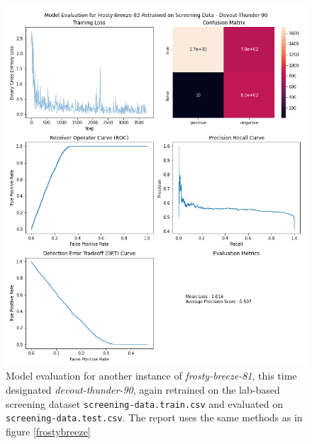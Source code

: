 \documentclass{article}
\begin{document}
\begin{figure}
	\caption{\label{devoutthunder} Model evaluation for another instance of \textit{frosty-breeze-81}, this time designated \textit{devout-thunder-90}, again retrained on the lab-based screening dataset \texttt{screening-data.train.csv} and evaluated on \texttt{screening-data.test.csv}. The report uses the same methods as in figure \ref{frostybreeze}}
	\includegraphics[width = \textwidth]{img/frosty-breeze-83-vivid-breeze-91-devout-thunder-90-eval.png}
\end{figure}
\end{document}
